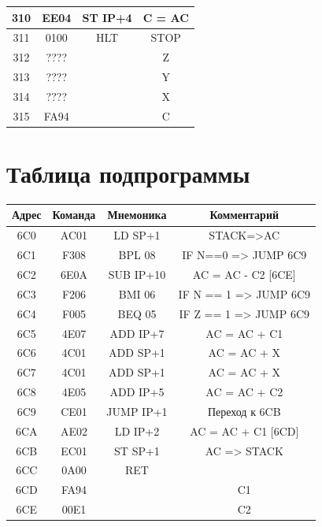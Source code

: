 \documentclass[14pt]{extreport}
\begin{document}
\begin{table}[h]
\begin{tabular}{|c|c|c|c|}
                310 & EE04 & ST IP+4    & C = AC\\ \hline
                311 & 0100 & HLT        & STOP\\ \hline \hline
                312 & ???? &            & Z \\ \hline
                313 & ???? &            & Y \\ \hline
                314 & ???? &            & X \\ \hline
                315 & FA94 &            & C \\ \hline
            \end{tabular}\label{tab:table}
        \end{table}

    \chapter{Таблица подпрограммы}
        \begin{table}[h]

            \centering
            \begin{tabular}{|c|c|c|c|}
                \hline
                Адрес & Команда & Мнемоника & Комментарий \\ \hline
                6C0 & AC01 & LD SP+1    & STACK=>AC\\ \hline \hline
                6C1 & F308 & BPL 08     & IF N==0 => JUMP 6C9\\ \hline
                6C2 & 6E0A & SUB IP+10  & AC = AC - C2 [6CE]\\ \hline
                6C3 & F206 & BMI 06     & IF N == 1 => JUMP 6C9\\ \hline
                6C4 & F005 & BEQ 05     & IF Z == 1 => JUMP 6C9\\ \hline
                6C5 & 4E07 & ADD IP+7   & AC = AC + C1\\ \hline
                6C6 & 4C01 & ADD SP+1   & AC = AC + X\\ \hline
                6C7 & 4C01 & ADD SP+1   & AC = AC + X\\ \hline
                6C8 & 4E05 & ADD IP+5   & AC = AC + C2\\ \hline
                6C9 & CE01 & JUMP IP+1  & Переход к 6CB\\ \hline
                6CA & AE02 & LD IP+2    & AC = AC + C1 [6CD]\\ \hline
                6CB & EC01 & ST SP+1    & AC => STACK \\ \hline
                6CC & 0A00 & RET        & \\ \hline \hline
                6CD & FA94 &            & C1 \\ \hline
                6CE & 00E1 &            & C2 \\ \hline
            \end{tabular}\label{tab:table}
        \end{table}
\end{document}
